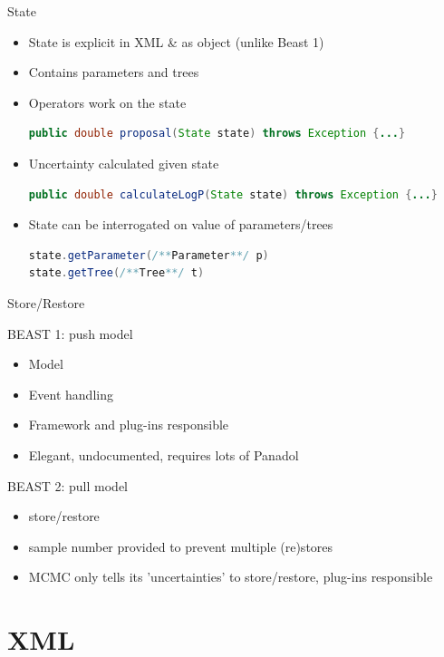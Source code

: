 \documentclass{beamer}
\theoremstyle{definition}
\begin{document}
\begin{frame}[containsverbatim]
{\Large State}
\begin{itemize}
\item State is explicit in XML \& as object (unlike Beast 1)
\item Contains parameters and trees
\item Operators work on the state
\begin{lstlisting}[language=java]
public double proposal(State state) throws Exception {...}
\end{lstlisting}
\item Uncertainty calculated given state
\begin{lstlisting}[language=java]
public double calculateLogP(State state) throws Exception {...}
\end{lstlisting}
\item State can be interrogated on value of parameters/trees
\begin{lstlisting}[language=java]
state.getParameter(/**Parameter**/ p)
state.getTree(/**Tree**/ t)
\end{lstlisting}
\end{itemize}
\end{frame}

\begin{frame}[containsverbatim]
{\Large Store/Restore}

BEAST 1: push model
\begin{itemize}
\item Model
\item Event handling
\item Framework and plug-ins responsible
\item Elegant, undocumented, requires lots of Panadol
\end{itemize}

BEAST 2: pull model
\begin{itemize}
\item store/restore 
\item sample number provided to prevent multiple (re)stores
\item MCMC only tells its 'uncertainties' to store/restore, plug-ins responsible
\end{itemize}
\end{frame}



\section{XML}
\end{document}
